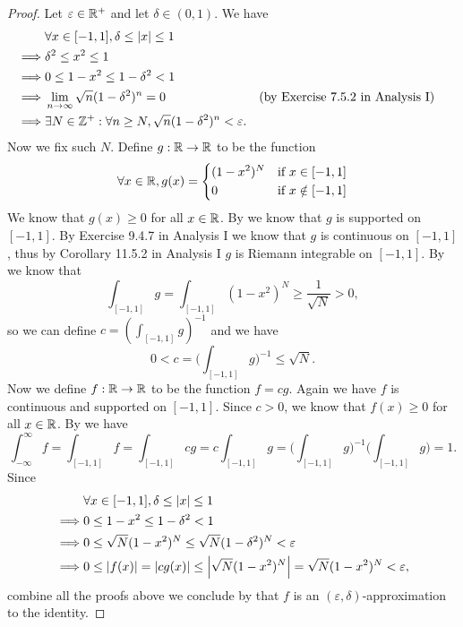 \begin{proof}
  Let \(\varepsilon \in \mathbb{R}^+\) and let \(\delta \in (0, 1)\).
  We have
  \begin{align*}
             & \forall x \in [-1, 1], \delta \leq \left\lvert x\right\rvert \leq 1                                                                             \\
    \implies & \delta^2 \leq x^2 \leq 1                                                                                                      \\
    \implies & 0 \leq 1 - x^2 \leq 1 - \delta^2 < 1                                                                                          \\
    \implies & \lim_{n \to \infty} \sqrt{n} (1 - \delta^2)^n = 0                               &  & \text{(by Exercise 7.5.2 in Analysis I)} \\
    \implies & \exists N \in \mathbb{Z}^+ : \forall n \geq N, \sqrt{n} (1 - \delta^2)^n < \varepsilon.
  \end{align*}
  Now we fix such \(N\).
  Define \(g : \mathbb{R} \to \mathbb{R}\) to be the function
  \[
    \forall x \in \mathbb{R}, g(x) = \begin{dcases}
      (1 - x^2)^N & \text{if } x \in [-1, 1]    \\
      0           & \text{if } x \notin [-1, 1]
    \end{dcases}
  \]
  We know that \(g(x) \geq 0\) for all \(x \in \mathbb{R}\).
  By  we know that \(g\) is supported on \([-1, 1]\).
  By Exercise 9.4.7 in Analysis I we know that \(g\) is continuous on \([-1, 1]\), thus by Corollary 11.5.2 in Analysis I \(g\) is Riemann integrable on \([-1, 1]\).
  By  we know that
  \[
    \int_{[-1, 1]} g = \int_{[-1, 1]} (1 - x^2)^N \geq \dfrac{1}{\sqrt{N}} > 0,
  \]
  so we can define \(c = (\int_{[-1, 1]} g)^{-1}\) and we have
  \[
    0 < c = \bigg(\int_{[-1, 1]} g\bigg)^{-1} \leq \sqrt{N}.
  \]
  Now we define \(f : \mathbb{R} \to \mathbb{R}\) to be the function \(f = cg\).
  Again we have \(f\) is continuous and supported on \([-1, 1]\).
  Since \(c > 0\), we know that \(f(x) \geq 0\) for all \(x \in \mathbb{R}\).
  By  we have
  \[
    \int_{-\infty}^\infty f = \int_{[-1, 1]} f = \int_{[-1, 1]} cg = c \int_{[-1, 1]} g = \bigg(\int_{[-1, 1]} g\bigg)^{-1} \bigg(\int_{[-1, 1]} g\bigg) = 1.
  \]
  Since
  \begin{align*}
             & \forall x \in [-1, 1], \delta \leq \left\lvert x\right\rvert \leq 1                                                     \\
    \implies & 0 \leq 1 - x^2 \leq 1 - \delta^2 < 1                                                                  \\
    \implies & 0 \leq \sqrt{N} (1 - x^2)^N \leq \sqrt{N} (1 - \delta^2)^N < \varepsilon                              \\
    \implies & 0 \leq \left\lvert f(x)\right\rvert = \left\lvert cg(x)\right\rvert \leq \left\lvert\sqrt{N} (1 - x^2)^N\right\rvert = \sqrt{N} (1 - x^2)^N < \varepsilon,
  \end{align*}
  combine all the proofs above we conclude by  that \(f\) is an \((\varepsilon, \delta)\)-approximation to the identity.
\end{proof}

